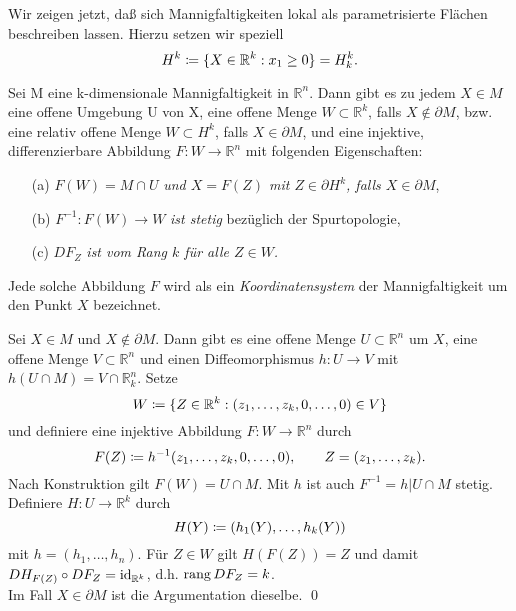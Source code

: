 \documentclass[a4paper,twoside,DIV15,BCOR12mm]{scrbook}
\begin{document}
\bigskip

\noindent
Wir zeigen jetzt, daß sich Mannigfaltigkeiten lokal als parametrisierte 
Flächen beschreiben lassen. Hierzu setzen wir speziell
\[H^k\da \{X\in \MdR^k:x_1\ge 0\}=H^k_k.\]

\bigskip

\begin{satz}\label{Satz3.6.2} {Sei M eine k-dimensionale 
Mannigfaltigkeit in ${\mathbb R}^{n}$. Dann gibt es zu jedem $X \in M$ 
eine offene Umgebung U von X, eine offene Menge $W \subset {\mathbb 
R}^{k}$, falls $X \notin \partial M$, bzw. eine relativ offene Menge 
$W \subset H^{k}$, falls $X \in \partial M$, und eine injektive, 
differenzierbare Abbildung $F: W \to {\mathbb R}^{n}$ mit folgenden 
Eigenschaften:}
\begin{enumerate}
\item[{\rm (a)}] $F(W) = M \cap U$ {\em und $X = F(Z)$ mit $Z\in\partial H^k$, falls $X 
\in \partial M$},
\item[{\rm (b)}] $F^{-1}: F(W) \to W$ {\em ist stetig} bezüglich der Spurtopologie, 
\item[{\rm (c)}] $DF_{Z}$ {\em ist vom Rang $k$ für alle $Z \in W$.}
\end{enumerate}
\end{satz}

\bigskip

\noindent
Jede solche Abbildung $F$ wird als ein {\em Koordinatensystem} der 
Mannigfaltigkeit um den Punkt $X$ bezeichnet.

\bigskip

 Sei $X \in M$ und $X \notin \partial M$. Dann 
gibt es eine offene Menge $U \subset {\mathbb R}^{n}$ um $X$, eine 
offene Menge $V \subset {\mathbb R}^{n}$ und einen Diffeomorphismus 
$h: U \to V$ mit $h(U \cap M) = V \cap {\mathbb R}_{k}^{n}$. Setze
\[ W \da  \{Z \in {\mathbb R}^{k}: (z_{1},\dots,z_{k},0,\dots,0) \in 
V\} \]
und definiere eine injektive Abbildung $F: W \to {\mathbb R}^{n}$ durch
\[ F(Z) \da  h^{-1}(z_{1},\dots,z_{k},0,\dots,0),\qquad Z=(z_1,\ldots,z_k). \]
Nach Konstruktion gilt $F(W) = U \cap M$. Mit $h$ ist auch $F^{-1}=h\vert U\cap M$ 
stetig. Definiere $H: U \to {\mathbb R}^{k}$ durch
\[ H(Y) \da  (h_{1}(Y),\dots,h_{k}(Y)) \]
mit $h = (h_{1},\dots,h_{n})$. Für $Z \in W$ gilt $H(F(Z)) = Z$ und 
damit $DH_{F(Z)} \circ DF_{Z} = \mbox{\rm id}_{{\mathbb R}^{k}}$, d.h. ${\rm 
rang}\, DF_{Z} = k$.\\

\noindent
Im Fall $X \in \partial M$ ist die Argumentation dieselbe. \qed\\
\end{document}
